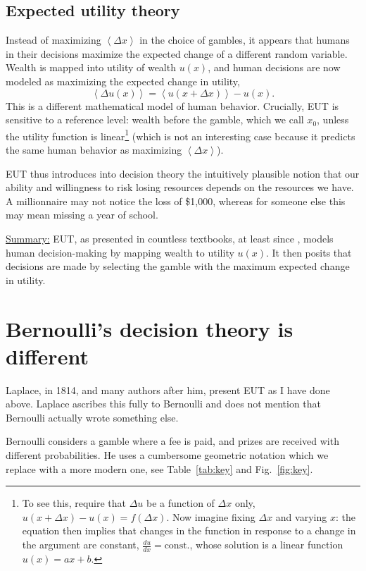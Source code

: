 \documentclass[pdftex]{article}
\newcommand{\ave}[1]{\left\langle#1 \right\rangle}
\newcommand{\elabel}[1]{\label{eq:#1}}
\newcommand{\tref}[1]{Table~\ref{tab:#1}}
\newcommand{\fref}[1]{Fig.~\ref{fig:#1}}
\newcommand{\seclabel}[1]{\label{section:#1}}
\newcommand{\be}{\begin{equation}}
\newcommand{\ee}{\end{equation}}
\newcommand{\Dx}{{\Delta x}}
\newcommand{\Du}{\Delta u}
\begin{document}
\subsection{Expected utility theory}
Instead of maximizing $\ave{\Dx}$ in the choice of gambles, it appears that humans in their decisions maximize the expected change of a different random variable. Wealth is mapped into utility of wealth $u(x)$, and human decisions are now modeled as maximizing the expected change in utility, 
\be
\ave{\Du(x)}=\ave{u(x+\Dx)}-u(x).
\elabel{EUT}
\ee
This is a different mathematical model of human behavior. Crucially, EUT is sensitive to a reference level: wealth before the gamble, which we call $x_0$, unless the utility function is linear\footnote{To see this, require that $\Du$ be a function of $\Dx$ only, $u(x+\Dx)-u(x)=f(\Dx)$. Now imagine fixing $\Dx$ and varying $x$: the equation then implies that changes in the function in response to a change in the argument are constant, $\frac{du}{dx}=\text{const.}$, whose solution is a linear function $u(x)=ax+b$.} (which is not an interesting case because it predicts the same human behavior as maximizing $\ave{\Dx}$).

EUT thus introduces into decision theory the intuitively plausible notion that our ability and willingness to risk losing resources depends on the resources we have. A millionnaire may not notice the loss of \$1,000, whereas for someone else this may mean missing a year of school.

\underline{Summary:} EUT, as presented in countless textbooks, at least since \cite{Laplace1814}, models human decision-making by mapping wealth to utility $u(x)$. It then posits that decisions are made by selecting the gamble with the maximum expected change in utility.

\section{Bernoulli's decision theory is different}
\seclabel{Bernoullis}
Laplace, in 1814, and many authors after him, present EUT as I have done above. Laplace ascribes this fully to Bernoulli and does not mention that Bernoulli actually wrote something else. 

Bernoulli considers a gamble where a fee is paid, and prizes are received with different probabilities. He uses a cumbersome geometric notation which we replace with a more modern one, see \tref{key} and \fref{key}.
\end{document}
